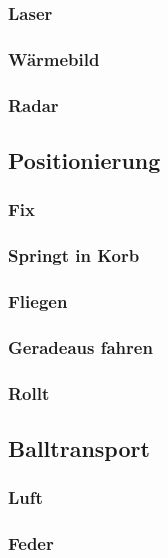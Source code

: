 \subsubsection{Laser}

\subsubsection{Wärmebild}

\subsubsection{Radar}

\subsection{Positionierung}

\subsubsection{Fix}

\subsubsection{Springt in Korb}

\subsubsection{Fliegen}

\subsubsection{Geradeaus fahren}

\subsubsection{Rollt}

\subsection{Balltransport}

\subsubsection{Luft}

\subsubsection{Feder}

